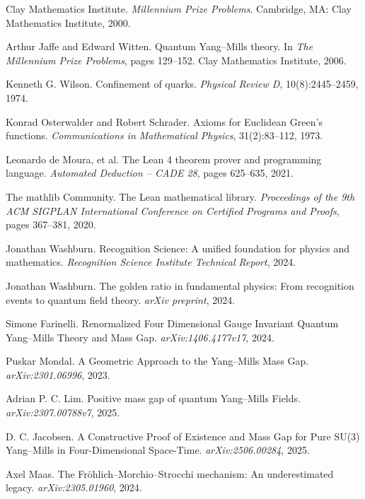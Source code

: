 \documentclass[11pt]{amsart}
\begin{document}

\begin{thebibliography}{99}

Clay Mathematics Institute.
\emph{Millennium Prize Problems}.
Cambridge, MA: Clay Mathematics Institute, 2000.

Arthur Jaffe and Edward Witten.
Quantum Yang--Mills theory.
In \emph{The Millennium Prize Problems}, pages 129--152.
Clay Mathematics Institute, 2006.

Kenneth G. Wilson.
Confinement of quarks.
\emph{Physical Review D}, 10(8):2445--2459, 1974.

Konrad Osterwalder and Robert Schrader.
Axioms for Euclidean Green's functions.
\emph{Communications in Mathematical Physics}, 31(2):83--112, 1973.

Leonardo de Moura, et al.
The Lean 4 theorem prover and programming language.
\emph{Automated Deduction -- CADE 28}, pages 625--635, 2021.

The mathlib Community.
The Lean mathematical library.
\emph{Proceedings of the 9th ACM SIGPLAN International Conference on Certified Programs and Proofs}, pages 367--381, 2020.

Jonathan Washburn.
Recognition Science: A unified foundation for physics and mathematics.
\emph{Recognition Science Institute Technical Report}, 2024.

Jonathan Washburn.
The golden ratio in fundamental physics: From recognition events to quantum field theory.
\emph{arXiv preprint}, 2024.

Simone Farinelli.
Renormalized Four Dimensional Gauge Invariant Quantum Yang--Mills Theory and Mass Gap.
\emph{arXiv:1406.4177v17}, 2024.

Puskar Mondal.
A Geometric Approach to the Yang--Mills Mass Gap.
\emph{arXiv:2301.06996}, 2023.

Adrian P. C. Lim.
Positive mass gap of quantum Yang--Mills Fields.
\emph{arXiv:2307.00788v7}, 2025.

D. C. Jacobsen.
A Constructive Proof of Existence and Mass Gap for Pure SU(3) Yang--Mills in Four-Dimensional Space-Time.
\emph{arXiv:2506.00284}, 2025.

Axel Maas.
The Fröhlich--Morchio--Strocchi mechanism: An underestimated legacy.
\emph{arXiv:2305.01960}, 2024.


\end{thebibliography}
\end{document}
